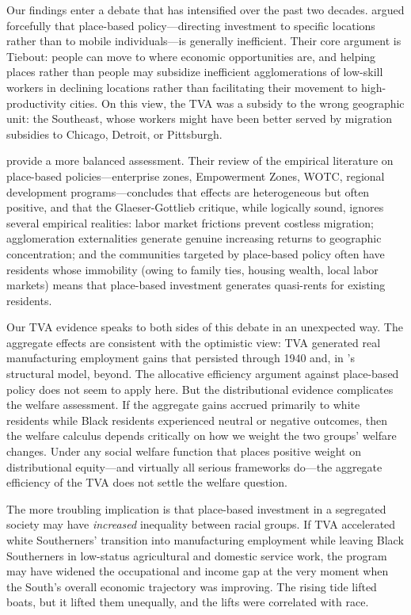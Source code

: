 \documentclass[12pt]{article}
\begin{document}
Our findings enter a debate that has intensified over the past two decades. \citet{glaeser2008} argued forcefully that place-based policy---directing investment to specific locations rather than to mobile individuals---is generally inefficient. Their core argument is Tiebout: people can move to where economic opportunities are, and helping places rather than people may subsidize inefficient agglomerations of low-skill workers in declining locations rather than facilitating their movement to high-productivity cities. On this view, the TVA was a subsidy to the wrong geographic unit: the Southeast, whose workers might have been better served by migration subsidies to Chicago, Detroit, or Pittsburgh.

\citet{neumark2015} provide a more balanced assessment. Their review of the empirical literature on place-based policies---enterprise zones, Empowerment Zones, WOTC, regional development programs---concludes that effects are heterogeneous but often positive, and that the Glaeser-Gottlieb critique, while logically sound, ignores several empirical realities: labor market frictions prevent costless migration; agglomeration externalities generate genuine increasing returns to geographic concentration; and the communities targeted by place-based policy often have residents whose immobility (owing to family ties, housing wealth, local labor markets) means that place-based investment generates quasi-rents for existing residents.

Our TVA evidence speaks to both sides of this debate in an unexpected way. The aggregate effects are consistent with the optimistic view: TVA generated real manufacturing employment gains that persisted through 1940 and, in \citeauthor{kline2014}'s structural model, beyond. The allocative efficiency argument against place-based policy does not seem to apply here. But the distributional evidence complicates the welfare assessment. If the aggregate gains accrued primarily to white residents while Black residents experienced neutral or negative outcomes, then the welfare calculus depends critically on how we weight the two groups' welfare changes. Under any social welfare function that places positive weight on distributional equity---and virtually all serious frameworks do---the aggregate efficiency of the TVA does not settle the welfare question.

The more troubling implication is that place-based investment in a segregated society may have \textit{increased} inequality between racial groups. If TVA accelerated white Southerners' transition into manufacturing employment while leaving Black Southerners in low-status agricultural and domestic service work, the program may have widened the occupational and income gap at the very moment when the South's overall economic trajectory was improving. The rising tide lifted boats, but it lifted them unequally, and the lifts were correlated with race.
\end{document}
